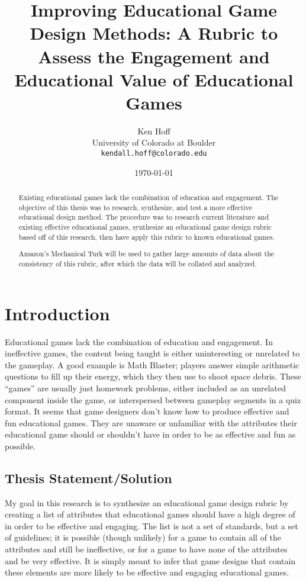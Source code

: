 \documentclass[12pt]{report}
\author{Ken Hoff \\ University of Colorado at Boulder \\ \texttt{kendall.hoff@colorado.edu} 
}
\date{\today}
\title{Improving Educational Game Design Methods: A Rubric to Assess the Engagement and Educational Value of Educational Games
}
\begin{document}
\maketitle

\begin{abstract}

Existing educational games lack the combination of education and engagement. The objective of this thesis was to research, synthesize, and test a more effective educational design method. The procedure was to research current literature and existing effective educational games, synthesize an educational game design rubric based off of this research, then have apply this rubric to known educational games. 

Amazon's Mechanical Turk will be used to gather large amounts of data about the consistency of this rubric, after which the data will be collated and analyzed.

\end{abstract}

\tableofcontents
\listoffigures

\chapter{Introduction}
	Educational games lack the combination of education and engagement. In ineffective games, the content being taught is either uninteresting or unrelated to the gameplay. A good example is Math Blaster; players answer simple arithmetic questions to fill up their energy, which they then use to shoot space debris. These “games” are usually just homework problems, either included as an unrelated component inside the game, or interspersed between gameplay segments in a quiz format. It seems that game designers don't know how to produce effective and fun educational games. They are unaware or unfamiliar with the attributes their educational game should or shouldn't have in order to be as effective and fun as possible.

	\section{Thesis Statement/Solution}
		My goal in this research is to synthesize an educational game design rubric by creating a list of attributes that educational games should have a high degree of in order to be effective and engaging. The list is not a set of standards, but a set of guidelines; it is possible (though unlikely) for a game to contain all of the attributes and still be ineffective, or for a game to have none of the attributes and be very effective. It is simply meant to infer that game designs that contain these elements are more likely to be effective and engaging educational games.
\end{document}
